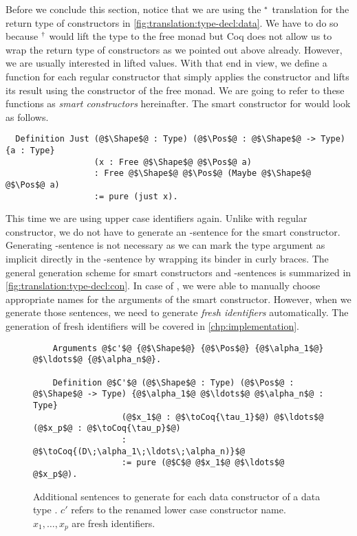Before we conclude this section, notice that we are using the ${}^{*}$ translation for the return type of constructors in \autoref{fig:translation:type-decl:data}.
We have to do so because ${}^{\dagger}$ would lift the type to the free monad but Coq does not allow us to wrap the return type of constructors as we pointed out above already.
However, we are usually interested in lifted values.
With that end in view, we define a function for each regular constructor that simply applies the constructor and lifts its result using the  constructor of the free monad.
We are going to refer to these functions as \textit{smart constructors} hereinafter.
The smart constructor for  would look as follows.
\begin{verbatim}
  Definition Just (@$\Shape$@ : Type) (@$\Pos$@ : @$\Shape$@ -> Type) {a : Type}
                  (x : Free @$\Shape$@ @$\Pos$@ a)
                  : Free @$\Shape$@ @$\Pos$@ (Maybe @$\Shape$@ @$\Pos$@ a)
                  := pure (just x).
\end{verbatim}
This time we are using upper case identifiers again.
Unlike with regular constructor, we do not have to generate an -sentence for the smart constructor.
Generating -sentence is not necessary as we can mark the type argument as implicit directly in the -sentence by wrapping its binder in curly braces.
The general generation scheme for smart constructors and -sentences is summarized in \autoref{fig:translation:type-decl:con}.
In case of , we were able to manually choose appropriate names for the arguments of the smart constructor.
However, when we generate those sentences, we need to generate \textit{fresh identifiers} automatically.
The generation of fresh identifiers will be covered in \autoref{chp:implementation}. %

\begin{figure}[H]
  \begin{verbatim}
    Arguments @$c'$@ {@$\Shape$@} {@$\Pos$@} {@$\alpha_1$@} @$\ldots$@ {@$\alpha_n$@}.

    Definition @$C'$@ (@$\Shape$@ : Type) (@$\Pos$@ : @$\Shape$@ -> Type) {@$\alpha_1$@ @$\ldots$@ @$\alpha_n$@ : Type}
                  (@$x_1$@ : @$\toCoq{\tau_1}$@) @$\ldots$@ (@$x_p$@ : @$\toCoq{\tau_p}$@)
                  : @$\toCoq{(D\;\alpha_1\;\ldots\;\alpha_n)}$@
                  := pure (@$C$@ @$x_1$@ @$\ldots$@ @$x_p$@).
  \end{verbatim}
  \caption{Additional sentences to generate for each data constructor  of a data type . $c'$ refers to the renamed lower case constructor name. $x_1, \ldots, x_p$ are fresh identifiers.}
  \label{fig:translation:type-decl:con}
\end{figure}

